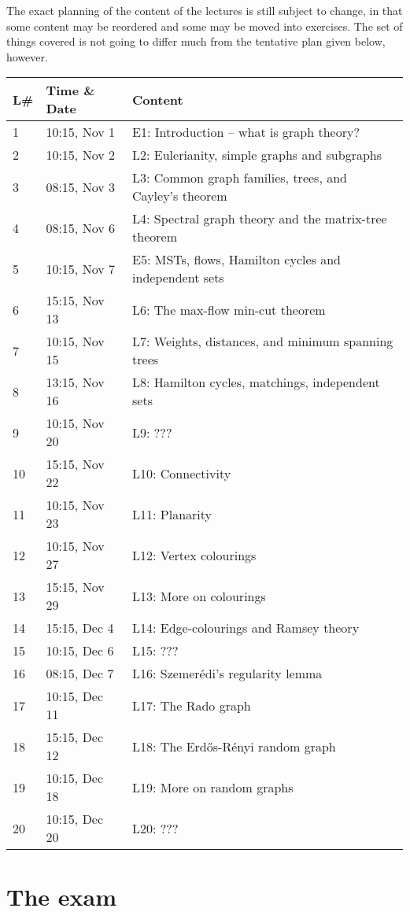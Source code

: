 \documentclass{tufte-handout}
\begin{document}
The exact planning of the content of the lectures is still subject to change, in that some content may be reordered and some may be moved into exercises. The set of things covered is not going to differ much from the tentative plan given below, however.

\begin{table}[h]
\begin{tabularx}{\textwidth}{llX}
L\# & Time \& Date      & Content \\ 
\midrule
1  & 10:15, Nov 1 & E1: Introduction -- what is graph theory?\\
2  & 10:15, Nov 2 & L2: Eulerianity, simple graphs and subgraphs\\
3  & 08:15, Nov 3 & L3: Common graph families, trees, and Cayley's theorem\\
4  & 08:15, Nov 6 & L4: Spectral graph theory and the matrix-tree theorem\\
5  & 10:15, Nov 7 & E5: MSTs, flows, Hamilton cycles and independent sets\\
6  & 15:15, Nov 13 & L6: The max-flow min-cut theorem\\
7  & 10:15, Nov 15 & L7: Weights, distances, and minimum spanning trees\\
8  & 13:15, Nov 16 & L8: Hamilton cycles, matchings, independent sets\\
9  & 10:15, Nov 20 & L9: ???\\
10 & 15:15, Nov 22 & L10: Connectivity\\
11 & 10:15, Nov 23 & L11: Planarity\\
12 & 10:15, Nov 27 & L12: Vertex colourings\\
13 & 15:15, Nov 29 & L13: More on colourings\\
14 & 15:15, Dec 4 & L14: Edge-colourings and Ramsey theory\\
15 & 10:15, Dec 6 & L15: ???\\
16 & 08:15, Dec 7 & L16: Szemerédi's regularity lemma\\
17 & 10:15, Dec 11 & L17: The Rado graph\\
18 & 15:15, Dec 12 & L18: The Erd\H{o}s-Rényi random graph\\
19 & 10:15, Dec 18 & L19: More on random graphs\\
20 & 10:15, Dec 20 & L20: ???
\end{tabularx}
\end{table}

\section{The exam}
\end{document}
